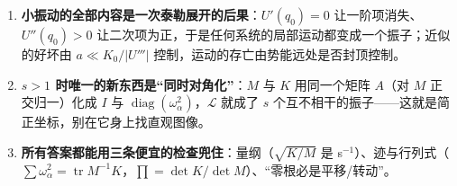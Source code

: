 \documentclass[11pt]{ctexart}
\begin{document}

\begin{enumerate}
\item \textbf{小振动的全部内容是一次泰勒展开的后果}：$U'(q_0)=0$ 让一阶项消失、$U''(q_0)>0$ 让二次项为正，于是任何系统的局部运动都变成一个振子；近似的好坏由 $a\ll K_0/|U'''|$ 控制，运动的存亡由势能远处是否封顶控制。
\item \textbf{$s>1$ 时唯一的新东西是“同时对角化”}：$M$ 与 $K$ 用同一个矩阵 $A$（对 $M$ 正交归一）化成 $I$ 与 $\operatorname{diag}(\omega_\alpha^2)$，$\mathcal{L}$ 就成了 $s$ 个互不相干的振子——这就是简正坐标，别在它身上找直观图像。
\item \textbf{所有答案都能用三条便宜的检查兜住}：量纲（$\sqrt{K/M}$ 是 s$^{-1}$）、迹与行列式（$\sum\omega_\alpha^2=\operatorname{tr}M^{-1}K$，$\prod=\det K/\det M$）、“零根必是平移/转动”。
\end{enumerate}


\end{document}
